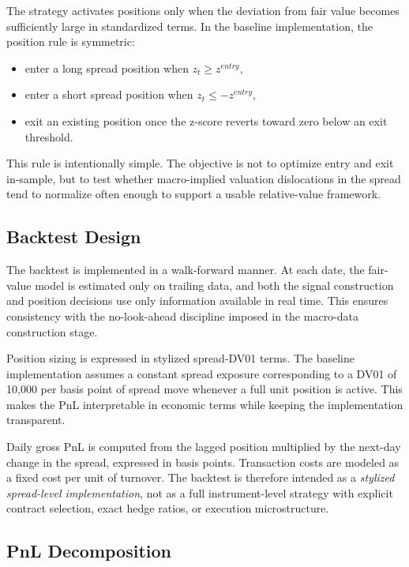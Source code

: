 \documentclass[11pt]{article}
\begin{document}
	The strategy activates positions only when the deviation from fair value becomes sufficiently large in standardized terms. In the baseline implementation, the position rule is symmetric:
	
	\begin{itemize}
		\item enter a long spread position when \(z_t \geq z^{entry}\),
		\item enter a short spread position when \(z_t \leq -z^{entry}\),
		\item exit an existing position once the z-score reverts toward zero below an exit threshold.
	\end{itemize}
	
	This rule is intentionally simple. The objective is not to optimize entry and exit in-sample, but to test whether macro-implied valuation dislocations in the spread tend to normalize often enough to support a usable relative-value framework.
	
	\subsection{Backtest Design}
	\label{subsec:backtest_design}
	
	The backtest is implemented in a walk-forward manner. At each date, the fair-value model is estimated only on trailing data, and both the signal construction and position decisions use only information available in real time. This ensures consistency with the no-look-ahead discipline imposed in the macro-data construction stage.
	
	Position sizing is expressed in stylized spread-DV01 terms. The baseline implementation assumes a constant spread exposure corresponding to a DV01 of 10,000 per basis point of spread move whenever a full unit position is active. This makes the PnL interpretable in economic terms while keeping the implementation transparent.
	
	Daily gross PnL is computed from the lagged position multiplied by the next-day change in the spread, expressed in basis points. Transaction costs are modeled as a fixed cost per unit of turnover. The backtest is therefore intended as a \emph{stylized spread-level implementation}, not as a full instrument-level strategy with explicit contract selection, exact hedge ratios, or execution microstructure.
	
	\subsection{PnL Decomposition}
	\label{subsec:pnl_decomposition}
	
\end{document}
